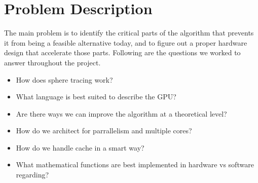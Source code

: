 \chapter{Problem Description}

The main problem is to identify the critical parts of the algorithm that
prevents it from being a feasible alternative today, and to figure out a proper
hardware design that accelerate those parts. Following are the questions we
worked to answer throughout the project.

\begin{itemize}
	\item	How does sphere tracing work?
	\item What language is best suited to describe the GPU?
	\item Are there ways we can improve the algorithm at a theoretical level?
	\item How do we architect for parrallelism and multiple cores?
	\item How do we handle cache in a smart way?
	\item What mathematical functions are best implemented in hardware vs software regarding?

\end{itemize}
